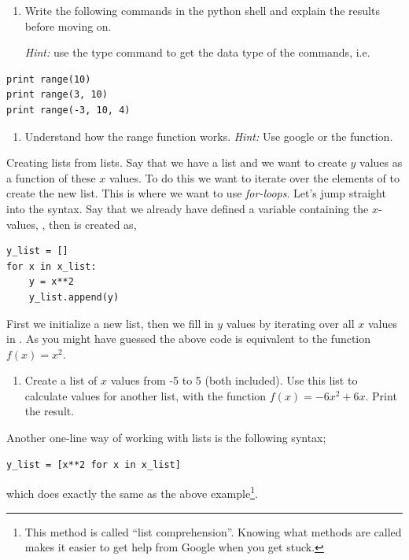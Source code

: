 \documentclass{article}
\begin{document}
\begin{enumerate}[resume]
  \item Write the following commands in the python shell and explain the results
    before moving on.

    {\em Hint:} use the type command to get the data type of the commands,
    i.e. 
\end{enumerate}


\begin{lstlisting}
print range(10)
print range(3, 10)
print range(-3, 10, 4)
\end{lstlisting}

\begin{enumerate}[resume]
    \item Understand how the range function works.
        {\em Hint:} Use google or the  function.
\end{enumerate}

Creating lists from lists.
Say that we have a list  and we want to create $y$ values as a function of these $x$ values.
To do this we want to iterate over the elements of  to create the new list.
This is where we want to use {\em for-loops}.
Let's jump straight into the syntax.
Say that we already have defined a variable containing the $x$-values, , then  is created as,

\begin{lstlisting}
y_list = []
for x in x_list:
    y = x**2
    y_list.append(y)
\end{lstlisting}

First we initialize a new list, then we fill in $y$ values by iterating over all $x$ values in .
As you might have guessed the above code is equivalent to the function $f(x) = x^2$.

\begin{enumerate}[resume]
    \item Create a list of $x$ values from -5 to 5 (both included).
    Use this list to calculate values for another list, with the function $f(x) = -6x^2 + 6x$.
    Print the result.
\end{enumerate}

Another one-line way of working with lists is the following syntax;

\begin{lstlisting}
y_list = [x**2 for x in x_list]
\end{lstlisting}

which does exactly the same as the above example\footnote{This method is called ``list comprehension''. Knowing what methods are called makes it easier to get help from Google when you get stuck.}.
\end{document}
